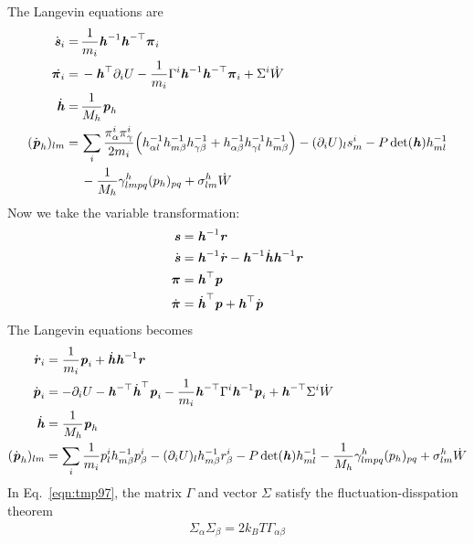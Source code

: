 \documentclass[aps, pre, preprint,unsortedaddress,a4paper,onecolumn]{revtex4}
\newcommand{\vect}[1]{\textbf{\textit{#1}}}
\newcommand{\mypi}{\boldsymbol\pi}
\newcommand{\dvs}{\dot{\vect s}}
\newcommand{\dvh}{\dot{\vect h}}
\newcommand{\dvr}{\dot{\vect r}}
\newcommand{\dvp}{\dot{\vect p}}
\newcommand{\inv}{{-1}}
\begin{document}
The Langevin equations are
\begin{align}
  \dvs_i =\,& \frac1{m_i}\vect h^{-1}\vect h^{-\top}\mypi_i \\
  \dot{\mypi_i} =\,& - \vect h^\top \partial_i U -   \frac1{m_i} \Gamma^i\vect h^{-1}\vect h^{-\top}\mypi_i + \Sigma^i \dot W\\
  \dvh =\,& \frac1{M_h}{\vect p_h}\\ \nonumber
  (\dot{\vect p}_h)_{lm} =\,& \sum_i\frac{\pi^i_\alpha\pi^i_\gamma}{2m_i}
                           \Big(
                           h^{-1}_{\alpha l}  h^{-1}_{ m\beta}h^{-1}_{\gamma\beta} 
                           +
                           h^{-1}_{\alpha\beta} h^{-1}_{\gamma l}  h^{-1}_{ m\beta}
                           \Big)
                           - (\partial_i U)_l  s^i_{m}
                           - P \det (\vect h) h^{-1}_{ml} \\
         &- \frac1{M_h} \gamma^h_{lmpq} (p_h)_{pq}
           + \sigma^h_{lm}\dot W
\end{align}
Now we take the variable transformation:
\begin{align}
  \vect s &= \vect h^\inv \vect r\\
  \dvs &=  \vect h^\inv \dvr - \vect h^\inv\dvh\vect h^\inv \vect r\\
  \mypi & = \vect  h^\top \vect p\\
  \dot{\mypi} &= \dvh^\top\vect p + \vect h^\top\dvp
\end{align}
The Langevin equations becomes
\begin{align}
  \dvr_i &= \frac1{m_i}\vect p_i + \dvh\vect h^\inv\vect r \\\label{eqn:tmp97}
  \dvp_i & = - \partial_i U - \vect h^{-\top}\dvh^\top\vect p_i -  \frac1{m_i}\vect h^{-\top} \Gamma^i \vect h^{-1}\vect p_i + \vect h^{-\top} \Sigma^i \dot W\\
  \dvh &= \frac1{M_h}{\vect p_h}\\\label{eqn:tmp99}
  (\dot{\vect p}_h)_{lm} & = \sum_i\frac{1}{m_i}
                           p^i_l h^\inv_{m\beta} p^i_\beta
                           - (\partial_i U)_l h^\inv_{m\beta}  r^i_{\beta}
                           - P \det (\vect h) h^{-1}_{ml}
                           - \frac1{M_h} \gamma^h_{lmpq} (p_h)_{pq}
                           + \sigma^h_{lm} \dot W
\end{align}
In Eq.~\eqref{eqn:tmp97}, the matrix $\Gamma$ and vector $\Sigma$ satisfy the fluctuation-disspation theorem
\begin{align}
  \Sigma_\alpha \Sigma_\beta = 2k_BT \Gamma_{\alpha\beta}
\end{align}
\end{document}
